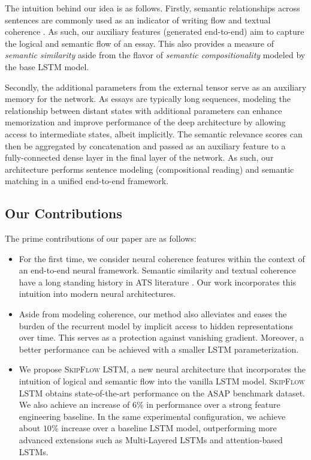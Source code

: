 \documentclass[letterpaper]{article}
\begin{document}
The intuition behind our idea is as follows. Firstly, semantic relationships across sentences are commonly used as an indicator of writing flow and textual coherence \cite{wiemer2000select,higgins2004evaluating,higgins2007sentence,DBLP:conf/emnlp/ChenH13,somasundaran2014lexical}. As such, our auxiliary features (generated end-to-end) aim to capture the logical and semantic flow of an essay. This also provides a measure of \textit{semantic similarity} aside from the flavor of \textit{semantic compositionality} modeled by the base LSTM model. 

Secondly, the additional parameters from the external tensor serve as an auxiliary memory for the network. As essays are typically long sequences, modeling the relationship between distant states with additional parameters can enhance memorization and improve performance of the deep architecture by allowing access to intermediate states, albeit implicitly. The semantic relevance scores can then be aggregated by concatenation and passed as an auxiliary feature to a fully-connected dense layer in the final layer of the network. As such, our architecture performs sentence modeling (compositional reading) and semantic matching in a unified end-to-end framework. 

\subsection{Our Contributions}

The prime contributions of our paper are as follows:
\begin{itemize}
\item For the first time, we consider neural coherence features within the context of an end-to-end neural framework. Semantic similarity and textual coherence have a long standing history in ATS literature \cite{wiemer2000select,higgins2007sentence,higgins2004evaluating}. Our work incorporates this intuition into modern neural architectures. 
\item Aside from modeling coherence, our method also alleviates and eases the burden of the recurrent model by implicit access to hidden representations over time. This serves as a protection against vanishing gradient. Moreover, a better performance can be achieved with a smaller LSTM parameterization. 
\item We propose \textsc{SkipFlow} LSTM, a new neural architecture that incorporates the intuition of logical and semantic flow into the vanilla LSTM model. \textsc{SkipFlow} LSTM obtains state-of-the-art performance on the ASAP benchmark dataset. We also achieve an increase of $6\%$ in performance over a strong feature engineering baseline. In the same experimental configuration, we achieve about $10\%$ increase over a baseline LSTM model, outperforming more advanced extensions such as Multi-Layered LSTMs and attention-based LSTMs. 
\end{itemize}
\end{document}
